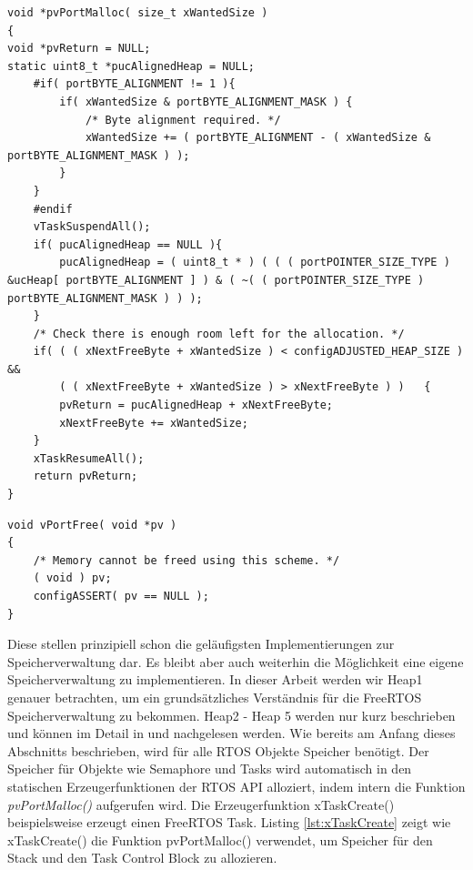 \begin{lstlisting}[caption={FreeRTOS Source von pvPortMalloc() aus Heap1.c. Zuerst wird sichergestellt, dass die Startspeicheradresse dem byte-Alignment des $\mu$\-Pro\-zesso\-rs entspricht. Der STM32F4 ist ein 32Bit $\mu$\-Pro\-zesso\-r und hat ein byte-Alignment von 4, sodass die Startadresse immer eine Potenz von 4 sein muss. Danach wird der Scheduler deaktiviert und geprüft, ob genug Speicher zur Verfügung steht. Abschließend wird der Speicher im ucHeap reserviert.  }, linewidth=8cm,captionpos=b, label=lst:malloc2, float=htb]
void *pvPortMalloc( size_t xWantedSize )
{
void *pvReturn = NULL;
static uint8_t *pucAlignedHeap = NULL;
	#if( portBYTE_ALIGNMENT != 1 ){
		if( xWantedSize & portBYTE_ALIGNMENT_MASK )	{
			/* Byte alignment required. */
			xWantedSize += ( portBYTE_ALIGNMENT - ( xWantedSize & portBYTE_ALIGNMENT_MASK ) );
		}
	}
	#endif
	vTaskSuspendAll();
	if( pucAlignedHeap == NULL ){
		pucAlignedHeap = ( uint8_t * ) ( ( ( portPOINTER_SIZE_TYPE ) &ucHeap[ portBYTE_ALIGNMENT ] ) & ( ~( ( portPOINTER_SIZE_TYPE ) portBYTE_ALIGNMENT_MASK ) ) );
	}
	/* Check there is enough room left for the allocation. */
	if( ( ( xNextFreeByte + xWantedSize ) < configADJUSTED_HEAP_SIZE ) &&
		( ( xNextFreeByte + xWantedSize ) > xNextFreeByte )	)	{
		pvReturn = pucAlignedHeap + xNextFreeByte;
		xNextFreeByte += xWantedSize;
	}
	xTaskResumeAll();
	return pvReturn;
}
\end{lstlisting}
\begin{lstlisting}[caption={FreeRTOS Source von vPortFree() aus Heap1.c . Da eine Speicherfreigabe in Heap1 nicht vorgesehen ist, ist diese Funktion leer.}, linewidth=8cm,captionpos=b, label=lst:free2, float=htb]
void vPortFree( void *pv )
{
	/* Memory cannot be freed using this scheme. */
	( void ) pv;
	configASSERT( pv == NULL );
}
\end{lstlisting} 
Diese stellen prinzipiell schon die ge\-läu\-figsten Implementierungen zur Speicherverwaltung dar. Es bleibt aber auch weiterhin die Möglichkeit eine eigene Speicherverwaltung zu implementieren. In dieser Arbeit werden wir Heap1 genauer betrachten, um ein grund\-sätz\-liches Ver\-ständ\-nis für die FreeRTOS Speicherverwaltung zu bekommen. Heap2 - Heap 5 werden nur kurz beschrieben und können im Detail in \cite{MasteringFreeRtos} und \cite{FreeRtosAdvanced} nachgelesen werden. Wie bereits am Anfang dieses Abschnitts beschrieben, wird für alle RTOS Objekte Speicher benötigt. Der Speicher für Objekte wie Semaphore und Tasks wird automatisch in den statischen Erzeugerfunktionen der RTOS API alloziert, indem intern die Funktion \textit{pvPortMalloc()} aufgerufen wird. Die Erzeugerfunktion xTaskCreate() beispielsweise erzeugt einen FreeRTOS Task. Listing \ref{lst:xTaskCreate} zeigt wie xTaskCreate() die Funktion pvPortMalloc() verwendet, um Speicher für den Stack und den Task Control Block zu allozieren.

